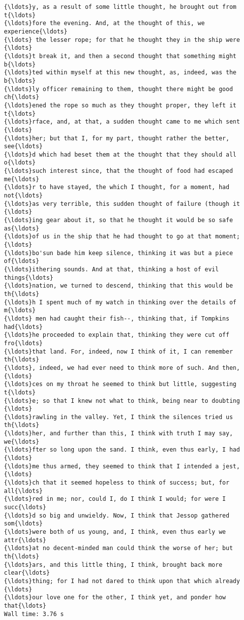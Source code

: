 \documentclass[11pt]{article}
\begin{document}
\begin{Verbatim}[commandchars=\\\{\}]
{\ldots}y, as a result of some little thought, he brought out from t{\ldots}
{\ldots}fore the evening. And, at the thought of this, we experience{\ldots}
{\ldots} the lesser rope; for that he thought they in the ship were {\ldots}
{\ldots}t break it, and then a second thought that something might b{\ldots}
{\ldots}ted within myself at this new thought, as, indeed, was the b{\ldots}
{\ldots}ly officer remaining to them, thought there might be good ch{\ldots}
{\ldots}ened the rope so much as they thought proper, they left it t{\ldots}
{\ldots}rface, and, at that, a sudden thought came to me which sent {\ldots}
{\ldots}her; but that I, for my part, thought rather the better, see{\ldots}
{\ldots}d which had beset them at the thought that they should all o{\ldots}
{\ldots}such interest since, that the thought of food had escaped me{\ldots}
{\ldots}r to have stayed, the which I thought, for a moment, had not{\ldots}
{\ldots}as very terrible, this sudden thought of failure (though it {\ldots}
{\ldots}ing gear about it, so that he thought it would be so safe as{\ldots}
{\ldots}of us in the ship that he had thought to go at that moment; {\ldots}
{\ldots}bo'sun bade him keep silence, thinking it was but a piece of{\ldots}
{\ldots}ithering sounds. And at that, thinking a host of evil things{\ldots}
{\ldots}nation, we turned to descend, thinking that this would be th{\ldots}
{\ldots}h I spent much of my watch in thinking over the details of m{\ldots}
{\ldots} men had caught their fish--, thinking that, if Tompkins had{\ldots}
{\ldots}he proceeded to explain that, thinking they were cut off fro{\ldots}
{\ldots}that land. For, indeed, now I think of it, I can remember th{\ldots}
{\ldots}, indeed, we had ever need to think more of such. And then, {\ldots}
{\ldots}ces on my throat he seemed to think but little, suggesting t{\ldots}
{\ldots}e; so that I knew not what to think, being near to doubting {\ldots}
{\ldots}rawling in the valley. Yet, I think the silences tried us th{\ldots}
{\ldots}her, and further than this, I think with truth I may say, we{\ldots}
{\ldots}fter so long upon the sand. I think, even thus early, I had {\ldots}
{\ldots}me thus armed, they seemed to think that I intended a jest, {\ldots}
{\ldots}ch that it seemed hopeless to think of success; but, for all{\ldots}
{\ldots}red in me; nor, could I, do I think I would; for were I succ{\ldots}
{\ldots}d so big and unwieldy. Now, I think that Jessop gathered som{\ldots}
{\ldots}were both of us young, and, I think, even thus early we attr{\ldots}
{\ldots}at no decent-minded man could think the worse of her; but th{\ldots}
{\ldots}ars, and this little thing, I think, brought back more clear{\ldots}
{\ldots}thing; for I had not dared to think upon that which already {\ldots}
{\ldots}our love one for the other, I think yet, and ponder how that{\ldots}
Wall time: 3.76 s

    \end{Verbatim}
\end{document}
